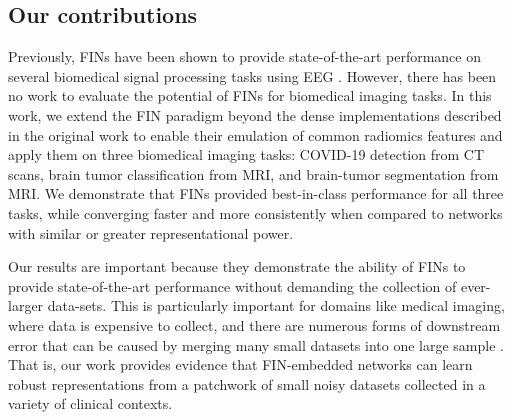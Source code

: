 \documentclass{article}
\begin{document}
\subsection{Our contributions}
Previously, FINs have been shown to provide state-of-the-art performance on several biomedical signal processing tasks using EEG \cite{saba2022feature}. However, there has been no work to evaluate the potential of FINs for biomedical imaging tasks. In this work, we extend the FIN paradigm beyond the dense implementations described in the original work \cite{saba2022feature} to enable their emulation of common radiomics features and apply them on three biomedical imaging tasks: COVID-19 detection from CT scans, brain tumor classification from MRI, and brain-tumor segmentation from MRI. We demonstrate that FINs provided best-in-class performance for all three tasks, while converging faster and more consistently when compared to networks with similar or greater representational power.

Our results are important because they demonstrate the ability of FINs to provide state-of-the-art performance without demanding the collection of ever-larger data-sets. This is particularly important for domains like medical imaging, where data is expensive to collect, and there are numerous forms of downstream error that can be caused by merging many small datasets into one large sample \cite{KUMAR20121234}. That is, our work provides evidence that FIN-embedded networks can learn robust representations from a patchwork of small noisy datasets collected in a variety of clinical contexts. 







\end{document}
